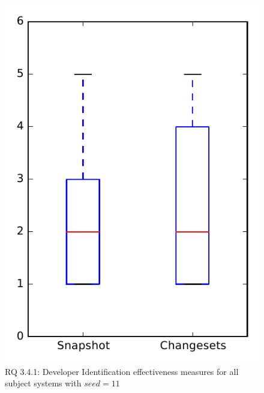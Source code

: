 
\begin{figure}
\centering
\includegraphics[height=0.4\textheight]{figures/dit_seed/rq1_overview_11}
\caption{RQ 3.4.1: Developer Identification effectiveness measures for all subject systems with $seed=11$}
\label{fig:dit_seed:rq1:overview}
\end{figure}
